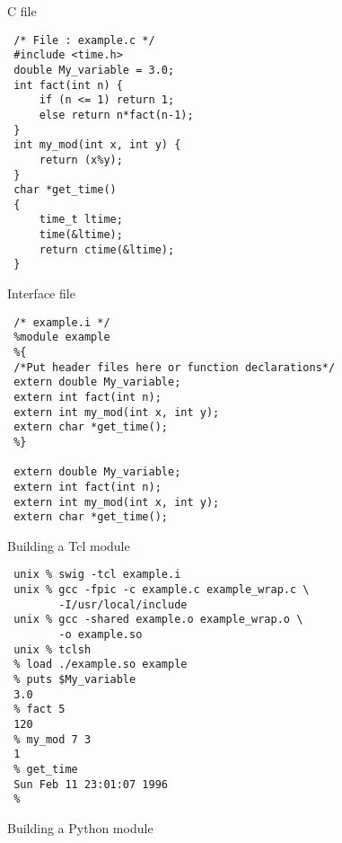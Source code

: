 \begin{frame}[containsverbatim]{C file}
\begin{lstlisting}
 /* File : example.c */
 #include <time.h>
 double My_variable = 3.0;
 int fact(int n) {
     if (n <= 1) return 1;
     else return n*fact(n-1);
 }
 int my_mod(int x, int y) {
     return (x%y);
 }
 char *get_time()
 {
     time_t ltime;
     time(&ltime);
     return ctime(&ltime);
 }
\end{lstlisting}
\end{frame}
\begin{frame}[containsverbatim]{Interface file}
\begin{lstlisting}
 /* example.i */
 %module example
 %{
 /*Put header files here or function declarations*/
 extern double My_variable;
 extern int fact(int n);
 extern int my_mod(int x, int y);
 extern char *get_time();
 %}
 
 extern double My_variable;
 extern int fact(int n);
 extern int my_mod(int x, int y);
 extern char *get_time();
\end{lstlisting} 
\end{frame}

\begin{frame}[containsverbatim]{Building a Tcl module}
\begin{lstlisting}
 unix % swig -tcl example.i
 unix % gcc -fpic -c example.c example_wrap.c \
        -I/usr/local/include 
 unix % gcc -shared example.o example_wrap.o \
        -o example.so
 unix % tclsh
 % load ./example.so example
 % puts $My_variable
 3.0
 % fact 5
 120
 % my_mod 7 3
 1
 % get_time
 Sun Feb 11 23:01:07 1996
 % 
\end{lstlisting}

Building a Python module

\end{frame} 

